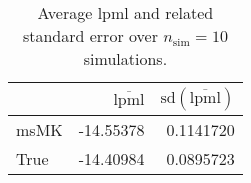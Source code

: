 \begin{table}[H]

\caption{Average lpml and related standard error over $n_{\text{sim}} = 10$ simulations.}
\centering
\begin{tabular}[t]{lrr}
\toprule
  & $\overbar{\text{lpml}}$ & $\text{sd}(\overbar{\text{lpml}})$\\
\midrule
msMK & -14.55378 & 0.1141720\\
True & -14.40984 & 0.0895723\\
\bottomrule
\end{tabular}
\end{table}